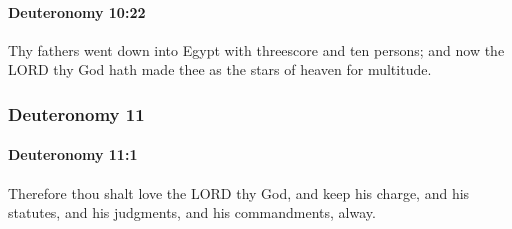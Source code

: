 		\paragraph{Deuteronomy 10:22} %
			\label{DEUTERONOMY-10-22}

			Thy fathers went down into Egypt with threescore and ten persons; and now the LORD thy God hath made thee as the stars of heaven for multitude.

	\subsubsection{Deuteronomy 11} %
		\label{DEUTERONOMY-11}

		\paragraph{Deuteronomy 11:1} %
			\label{DEUTERONOMY-11-1}

			Therefore thou shalt love the LORD thy God, and keep his charge, and his statutes, and his judgments, and his commandments, alway.

